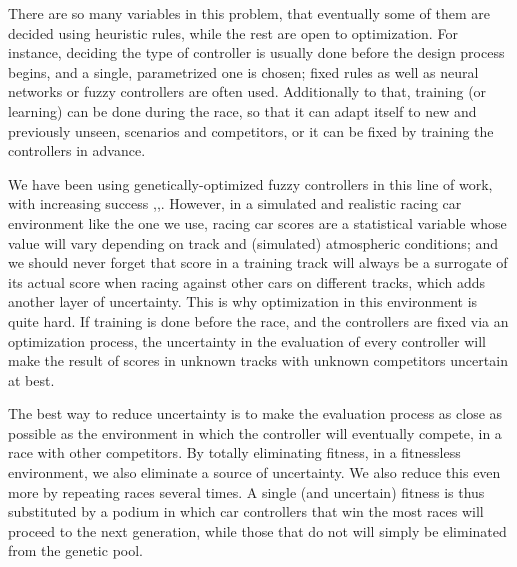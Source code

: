 \documentclass[10pt,journal,compsoc]{IEEEtran}
\begin{document}
There are so many variables in this problem, that eventually some of
them are decided using heuristic rules, while the rest are open to
optimization. For instance, deciding the type of controller is usually
done before the design process begins, and a single, parametrized one
is chosen; fixed rules as well as neural networks \cite{KIM201287} or fuzzy controllers \cite{PerezEvolvingFuzzy09} are often used. 
Additionally to that, training (or learning) \cite{Loiacono:2012:LEA:2212908.2212953} can be done during the
race, so that it can adapt itself to new and previously unseen,
scenarios and competitors, or it can be fixed by training the
controllers in advance. 

We have been using genetically-optimized fuzzy controllers in this line of work, with increasing success \cite{salem_evo17},\cite{salem_evo18},.
However, in a simulated and realistic racing car environment like the one we use, racing car scores are a
    statistical variable whose value will vary depending on track and
    (simulated) atmospheric conditions; and we should never forget
    that score in a training track will always be a surrogate of its
    actual score when racing against other cars on different tracks,
    which adds another layer of uncertainty. This is why optimization
    in this environment is quite hard. If training is done before the
    race, and the controllers are fixed via an optimization process,
    the uncertainty in the evaluation of every controller will make
    the result of scores in unknown tracks with unknown competitors
    uncertain at best.

The best way to reduce uncertainty is to make the evaluation process
as close as possible as the environment in which the controller will
eventually compete, in a race with other competitors. By totally
eliminating fitness, in a fitnessless environment, we also eliminate
a source of uncertainty. We also reduce this even more by repeating
races several times. A single (and uncertain) fitness is thus
substituted by a podium in which car controllers that win the most
races will proceed to the next generation, while those that do not
will simply be eliminated from the genetic pool. 
\end{document}
